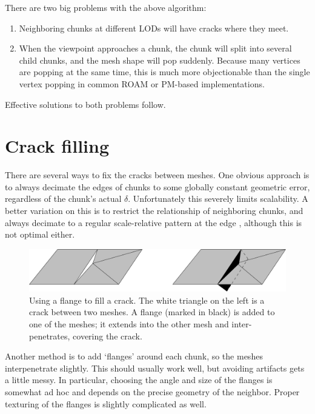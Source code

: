 \documentclass[12pt]{article}
\begin{document}

There are two big problems with the above algorithm:
 
\begin{enumerate}

\item Neighboring chunks at different LODs will have cracks where they meet.

\item When the viewpoint approaches a chunk, the chunk will split into
several child chunks, and the mesh shape will pop suddenly.  Because
many vertices are popping at the same time, this is much more
objectionable than the single vertex popping in common ROAM or
PM-based implementations.

\end{enumerate}

Effective solutions to both problems follow.
 
\section{Crack filling}

There are several ways to fix the cracks between meshes.  One obvious
approach is to always decimate the edges of chunks to some globally
constant geometric error, regardless of the chunk's actual $\delta$.
Unfortunately this severely limits scalability.  A better variation on
this is to restrict the relationship of neighboring chunks, and always
decimate to a regular scale-relative pattern at the edge
\cite{levenberg}\cite{pomeranz}, although this is not optimal either.
 
\begin{figure}[h]
\centering
\includegraphics[width=6in]{sig-fig-flange}
\caption{Using a flange to fill a crack.  The white triangle on the
left is a crack between two meshes.  A flange (marked in black) is
added to one of the meshes; it extends into the other mesh and
inter-penetrates, covering the crack.}
\label{fig:flange}
\end{figure}

Another method is to add `flanges' around each chunk, so the meshes
interpenetrate slightly.  This should usually work well, but avoiding
artifacts gets a little messy.  In particular, choosing the angle and
size of the flanges is somewhat ad hoc and depends on the precise
geometry of the neighbor.  Proper texturing of the flanges is slightly
complicated as well.
\end{document}
